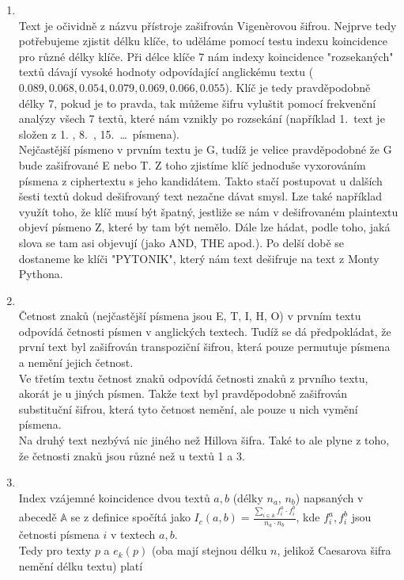 \documentclass[12pt]{article}
\begin{document}
\begin{enumerate}
		\item \quad\\
		Text je očividně z názvu přístroje zašifrován Vigenèrovou šifrou. Nejprve tedy potřebujeme zjistit délku klíče, to uděláme pomocí testu indexu koincidence pro různé délky klíče. Při délce klíče 7 nám indexy koincidence "rozsekaných" textů dávají vysoké hodnoty odpovídající anglickému textu ($0.089, 0.068, 0.054, 0.079, 0.069, 0.066, 0.055$). Klíč je tedy pravděpodobně délky 7, pokud je to pravda, tak můžeme šifru vyluštit pomocí frekvenční analýzy všech 7 textů, které nám vznikly po rozsekání (například 1.\ text je složen z 1. , 8.\ , 15.\ \dots \, písmena).\\
		Nejčastější písmeno v prvním textu je G, tudíž je velice pravděpodobné že G bude zašifrované E nebo T. Z toho zjistíme klíč jednoduše vyxorováním písmena z ciphertextu s jeho kandidátem. Takto stačí postupovat u dalších šesti textů dokud dešifrovaný text nezačne dávat smysl. Lze také například využít toho, že klíč musí být špatný, jestliže se nám v dešifrovaném plaintextu objeví písmeno Z, které by tam být nemělo. Dále lze hádat, podle toho, jaká slova se tam asi objevují (jako AND, THE apod.). Po delší době se dostaneme ke klíči "PYTONIK", který nám text dešifruje na text z Monty Pythona.
		\item \quad\\
		Četnost znaků (nejčastější písmena jsou E, T, I, H, O) v prvním textu odpovídá  četnosti písmen v anglických textech. Tudíž se dá předpokládat, že první text byl zašifrován transpoziční šifrou, která pouze permutuje písmena a nemění jejich četnost.\\
		Ve třetím textu četnost znaků odpovídá četnosti znaků z prvního textu, akorát je u jiných písmen. Takže text byl pravděpodobně zašifrován substituční šifrou, která tyto četnost nemění, ale pouze u nich vymění písmena.\\
		Na druhý text nezbývá nic jiného než Hillova šifra. Také to ale plyne z toho, že četnosti znaků jsou různé než u textů 1 a 3. 
		\item \quad\\
		Index vzájemné koincidence dvou textů $a,b$ (délky $n_a$, $n_b$) napsaných v abecedě $\mathbb{A}$  se z definice spočítá jako 
		$I_c(a,b) = \frac{\sum_{i\in \mathbb{A}} f_i^a \cdot f_i^b}{n_a \cdot n_b}$, kde $f_i^a, f_i^b$ jsou  četnosti písmena $i$ v textech $a, b$.\\
		Tedy pro texty $p$ a $e_k(p)$ (oba mají stejnou délku $n$, jelikož Caesarova šifra nemění délku textu) platí\\

\end{enumerate}
\end{document}
